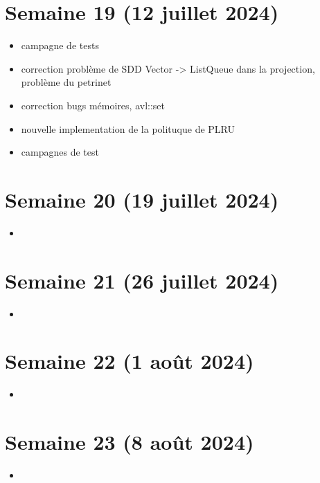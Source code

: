 \documentclass[a4paper,12pt]{article}
\begin{document}
\section{Semaine 19 (12 juillet 2024)}

\begin{itemize}
  \item campagne de tests
  \item correction problème de SDD Vector -> ListQueue dans la projection, problème du petrinet
  \item correction bugs mémoires, avl::set
  \item nouvelle implementation de la polituque de PLRU
  \item campagnes de test
\end{itemize}

\section{Semaine 20 (19 juillet 2024)}

\begin{itemize}
  \item ~
\end{itemize}

\section{Semaine 21 (26 juillet 2024)}

\begin{itemize}
  \item ~
\end{itemize}

\section{Semaine 22 (1 août 2024)}

\begin{itemize}
  \item ~
\end{itemize}

\section{Semaine 23 (8 août 2024)}

\begin{itemize}
  \item ~
\end{itemize}
\end{document}
